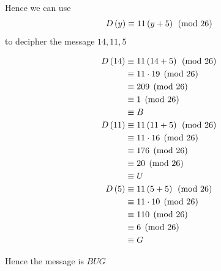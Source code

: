 \documentclass{tufte-handout}
\begin{document}
\begin{question}
\vspace{3cm}

\qsubpart

Hence we can use
\[ D\left(y\right) \equiv 11\left(y + 5\right)\pmod{26} \]
to decipher the message \( 14, 11, 5 \)

\begin{align*}
D\left(14\right) &\equiv 11\left(14 + 5\right) \pmod{26}\\
    &\equiv 11\cdot{19} \pmod{26}\\
    &\equiv 209 \pmod{26}\\
    &\equiv 1 \pmod{26}\\
    &\equiv B\\
D\left(11\right) &\equiv 11\left(11 + 5\right) \pmod{26}\\
    &\equiv 11\cdot{16} \pmod{26}\\
    &\equiv 176 \pmod{26}\\
    &\equiv 20 \pmod{26}\\
    &\equiv U\\
D\left(5\right) &\equiv 11\left(5 + 5\right) \pmod{26}\\
    &\equiv 11\cdot{10} \pmod{26}\\
    &\equiv 110 \pmod{26}\\
    &\equiv 6 \pmod{26}\\
    &\equiv G
\end{align*}

Hence the message is \( BUG \)

\end{question}

\clearpage
\end{document}
